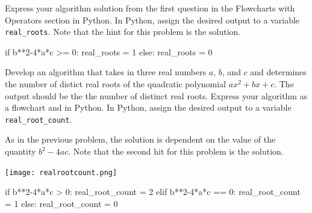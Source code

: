 \documentclass{ximera}
\begin{document}
\begin{question}
	Express your algorithm solution from the first question in the Flowcharts with Operators section in Python. In Python, assign the desired output to a variable \verb|real_roots|.  Note that the hint for this problem is the solution. 
	\begin{hint}
\begin{sageCell}
if b**2-4*a*c >= 0:
	real_roots = 1
else:
	real_roots = 0
\end{sageCell}
	\end{hint}
\end{question}

\begin{question}
	Develop an algorithm that takes in three real numbers $a$, $b$, and $c$ and determines the number of distict real roots of the quadratic polynomial $ax^2+bx+c$. The output should be the the number of distinct real roots. Express your algorithm as a flowchart and in Python. In Python, assign the desired output to a variable \verb|real_root_count|.
	\begin{hint}
	As in the previous problem, the solution is dependent on the value of the quantity $b^2-4ac$. Note that the second hit for this problem is the solution.
	\end{hint}
	\begin{hint}
		\begin{center}
			\texttt{[image: realrootcount.png]}
		\end{center}
\begin{sageCell}
if b**2-4*a*c > 0:
	real_root_count = 2
elif b**2-4*a*c == 0:
	real_root_count = 1
else:
	real_root_count = 0
\end{sageCell}
	\end{hint}
\end{question}
\end{document}
